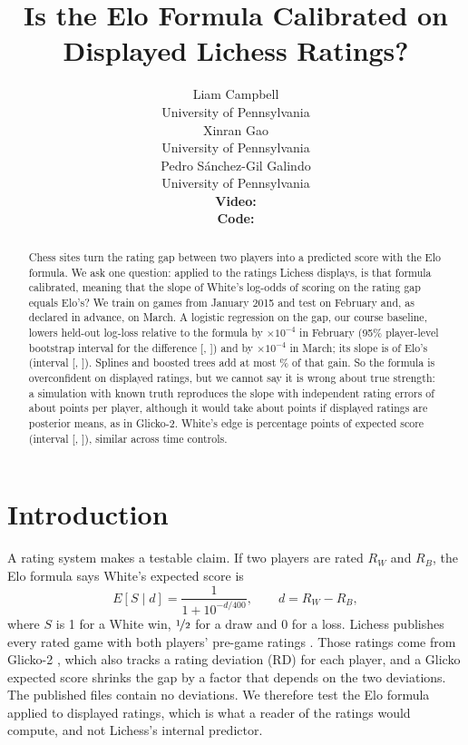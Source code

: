 \documentclass{article}
\title{Is the Elo Formula Calibrated on Displayed Lichess Ratings?}
\author{%
  Liam Campbell \\
  University of Pennsylvania \\
  \And
  Xinran Gao \\
  University of Pennsylvania \\
  \And
  Pedro S{\'a}nchez-Gil Galindo \\
  University of Pennsylvania \\
  \AND
  \textbf{Video:} \videourl \\ \textbf{Code:} \codeurl
}
\newcommand{\tenm}{$\times 10^{-4}$}
\begin{document}
\maketitle

\begin{abstract}
Chess sites turn the rating gap between two players into a predicted score with the Elo formula. We ask one question: applied to the ratings Lichess displays, is that formula calibrated, meaning that the slope of White's log-odds of scoring on the rating gap equals Elo's? We train on \nGamesJan{} games from January 2015 and test on February and, as declared in advance, on March. A logistic regression on the gap, our course baseline, lowers held-out log-loss relative to the formula by \dEloBaseFebAbs{}\tenm{} in February (95\% player-level bootstrap interval for the difference [\dEloBaseFebLo{}, \dEloBaseFebHi{}]) and by \dEloBaseMarAbs{}\tenm{} in March; its slope is \SlopeAllJan{} of Elo's (interval [\SlopeAllJanLo{}, \SlopeAllJanHi{}]). Splines and boosted trees add at most \gainPctBoost\% of that gain. So the formula is overconfident on displayed ratings, but we cannot say it is wrong about true strength: a simulation with known truth reproduces the slope with independent rating errors of about \sigmaClass{} points per player, although it would take about \sigmaBerk{} points if displayed ratings are posterior means, as in Glicko-2. White's edge is \EdgePPAllJan{} percentage points of expected score (interval [\EdgePPAllJanLo{}, \EdgePPAllJanHi{}]), similar across time controls.
\end{abstract}

\section{Introduction}

A rating system makes a testable claim. If two players are rated $R_W$ and $R_B$, the Elo formula \citep{elo1978} says White's expected score is
\begin{equation}
  E[S \mid d] = \frac{1}{1 + 10^{-d/400}}, \qquad d = R_W - R_B,
  \label{eq:elo}
\end{equation}
where $S$ is 1 for a White win, $\nicefrac{1}{2}$ for a draw and 0 for a loss. Lichess publishes every rated game with both players' pre-game ratings \citep{lichessdb}. Those ratings come from Glicko-2 \citep{glickman1999,glickman2001}, which also tracks a rating deviation (RD) for each player, and a Glicko expected score shrinks the gap by a factor that depends on the two deviations. The published files contain no deviations. We therefore test the Elo formula applied to displayed ratings, which is what a reader of the ratings would compute, and not Lichess's internal predictor.
\end{document}

